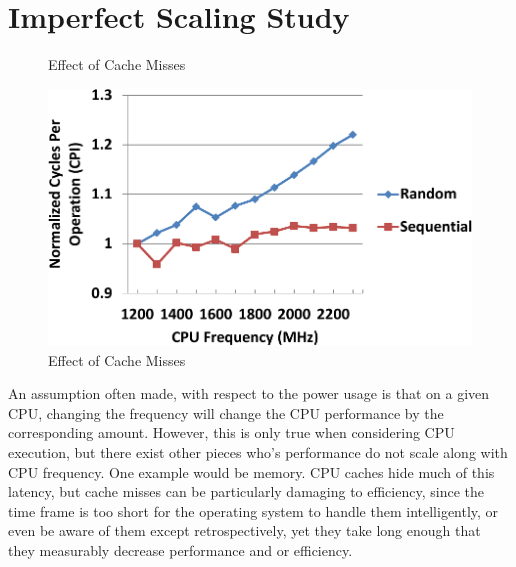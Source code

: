 \section{Imperfect Scaling Study}\label{sec:case-study}

\begin{figure}[ht]
\caption{Effect of Cache Misses}
\label{fig:cache}
\end{figure}
\fi 

\begin{figure}
  \begin{center}
\includegraphics[width=\linewidth]{figs/case-crop.pdf}
  \end{center}
  \vspace{-0.1in}
  \caption{Effect of Cache Misses}
	\label{fig:case}
\end{figure}



An assumption often made, with respect to the power usage 
is that on a given CPU, changing the frequency will change the CPU performance by the corresponding amount.
However, this is only true when considering CPU execution, 
but there exist other pieces who's performance do not scale along with CPU frequency.
One example would be memory. CPU caches hide much of this latency, but cache misses can be particularly damaging to efficiency, since the time frame is too short for the operating system to handle them intelligently, or even be aware of them except retrospectively, yet they take long enough that they measurably decrease performance and or efficiency.
 

